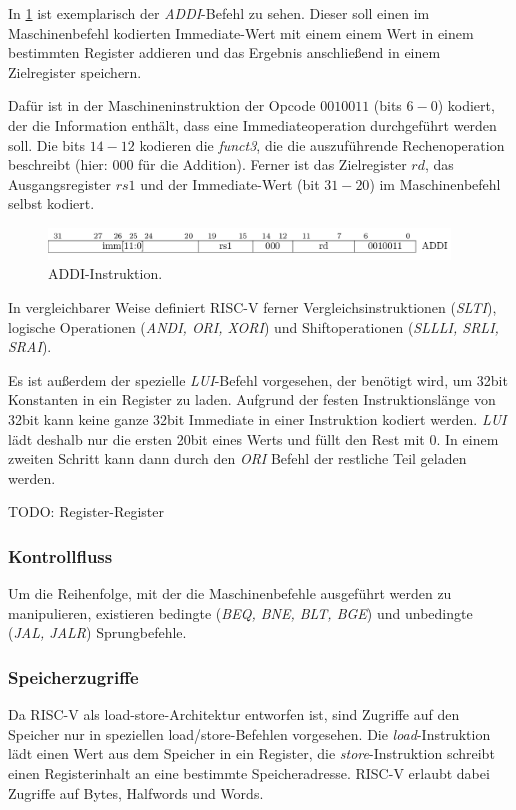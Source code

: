 In \ref{fig:addi} ist exemplarisch der \textit{ADDI}-Befehl zu sehen. Dieser soll einen im Maschinenbefehl kodierten Immediate-Wert mit einem einem Wert in einem bestimmten Register addieren und das Ergebnis anschließend in einem Zielregister speichern.
 
Dafür ist in der Maschineninstruktion der Opcode $0010011$ (bits $6 - 0$) kodiert, der die Information enthält, dass eine Immediateoperation durchgeführt werden soll. Die bits $14-12$ kodieren die \textit{funct3}, die die auszuführende Rechenoperation beschreibt (hier: $000$ für die Addition). Ferner ist das Zielregister $rd$, das Ausgangsregister $rs1$ und der Immediate-Wert (bit $31 - 20$) im Maschinenbefehl selbst kodiert.

\begin{figure} [ht]
  \centering
  \includegraphics[width=0.95\textwidth]{Figures/ADDI}
  \caption{ADDI-Instruktion.}
  \label{fig:addi}
\end{figure}

In vergleichbarer Weise definiert RISC-V ferner Vergleichsinstruktionen (\textit{SLTI}), logische Operationen (\textit{ANDI, ORI, XORI}) und Shiftoperationen (\textit{SLLLI, SRLI, SRAI}). 

Es ist außerdem der spezielle \textit{LUI}-Befehl vorgesehen, der benötigt wird, um 32bit Konstanten in ein Register zu laden. Aufgrund der festen Instruktionslänge von 32bit kann keine ganze 32bit Immediate in einer Instruktion kodiert werden. \textit{LUI} lädt deshalb nur die ersten 20bit eines Werts und füllt den Rest mit $0$. In einem zweiten Schritt kann dann durch den \textit{ORI} Befehl der restliche Teil geladen werden.

TODO: Register-Register

\subsubsection{Kontrollfluss}
Um die Reihenfolge, mit der die Maschinenbefehle ausgeführt werden zu manipulieren, existieren bedingte (\textit{BEQ, BNE, BLT, BGE}) und unbedingte (\textit{JAL, JALR}) Sprungbefehle.

\subsubsection{Speicherzugriffe}
Da RISC-V als load-store-Architektur entworfen ist, sind Zugriffe auf den Speicher nur in speziellen load/store-Befehlen vorgesehen. Die \textit{load}-Instruktion lädt einen Wert aus dem Speicher in ein Register, die \textit{store}-Instruktion schreibt einen Registerinhalt an eine bestimmte Speicheradresse. RISC-V erlaubt dabei Zugriffe auf Bytes, Halfwords und Words.

